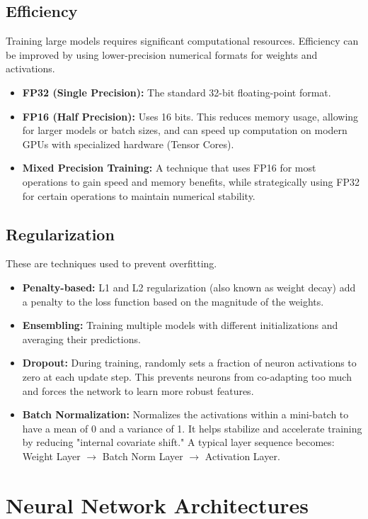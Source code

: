 \documentclass{article}
\begin{document}
\begin{multicols}{2}
	\subsection{Efficiency}
	Training large models requires significant computational resources. Efficiency can be improved by using lower-precision numerical formats for weights and activations.
	\begin{itemize}
		\item \textbf{FP32 (Single Precision):} The standard 32-bit floating-point format.
		\item \textbf{FP16 (Half Precision):} Uses 16 bits. This reduces memory usage, allowing for larger models or batch sizes, and can speed up computation on modern GPUs with specialized hardware (Tensor Cores).
		\item \textbf{Mixed Precision Training:} A technique that uses FP16 for most operations to gain speed and memory benefits, while strategically using FP32 for certain operations to maintain numerical stability.
	\end{itemize}

	\subsection{Regularization}
	These are techniques used to prevent overfitting.
	\begin{itemize}
		\item \textbf{Penalty-based:} L1 and L2 regularization (also known as weight decay) add a penalty to the loss function based on the magnitude of the weights.
		\item \textbf{Ensembling:} Training multiple models with different initializations and averaging their predictions.
		\item \textbf{Dropout:} During training, randomly sets a fraction of neuron activations to zero at each update step. This prevents neurons from co-adapting too much and forces the network to learn more robust features.
		\item \textbf{Batch Normalization:} Normalizes the activations within a mini-batch to have a mean of 0 and a variance of 1. It helps stabilize and accelerate training by reducing "internal covariate shift." A typical layer sequence becomes: Weight Layer $\rightarrow$ Batch Norm Layer $\rightarrow$ Activation Layer.
	\end{itemize}

	\section{Neural Network Architectures}

\end{multicols}
\end{document}
